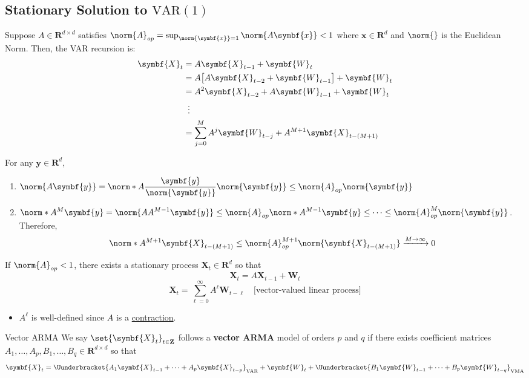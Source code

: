 \subsection*{Stationary Solution to $ \text{VAR}(1) $}
Suppose $ A\in\mathbf{R}^{d\times d} $ satisfies $ \norm{A}_{op}=\sup_{\norm{\symbf{x}}=1}\norm{A \symbf{x}}<1 $
where $ \symbf{x}\in\mathbf{R}^d $ and $ \norm{} $ is the Euclidean Norm.
Then, the VAR recursion is:
\begin{align*}
    \symbf{X}_t
     & =A \symbf{X}_{t-1}+\symbf{W}_t                                   \\
     & =A\bigl[A \symbf{X}_{t-2}+\symbf{W}_{t-1}\bigr]+\symbf{W}_t      \\
     & =A^2 \symbf{X}_{t-2}+ A \symbf{W}_{t-1}+\symbf{W}_t              \\
     & \vdotswithin{=}                                                  \\
     & =\sum_{j=0}^{M} A^j \symbf{W}_{t-j}+ A^{M+1} \symbf{X}_{t-(M+1)}
\end{align*}
\begin{Remark}{}{}
    For any $ \symbf{y}\in\mathbf{R}^d $,
    \begin{enumerate}[(1)]
        \item $ \displaystyle \norm{A \symbf{y}}=\norm*{A \frac{\symbf{y}}{\norm{\symbf{y}}}}\norm{\symbf{y}}\le \norm{A}_{op}\norm{\symbf{y}} $
        \item $ \displaystyle \norm*{A^M \symbf{y}}=\norm {A A^{M-1}\symbf{y}}\le \norm{A}_{op}\norm*{A^{M-1}\symbf{y}}\le \cdots\le \norm{A}_{op}^M\norm{\symbf{y}} $.
              Therefore,
              \[ \norm*{A^{M+1}\symbf{X}_{t-(M+1)}}\le \norm{A}_{op}^{M+1}\norm {\symbf{X}_{t-(M+1)}}\xrightarrow{M\to\infty}0 \]
    \end{enumerate}
\end{Remark}
\begin{Theorem}{}{}
    If $ \norm{A}_{op}< 1 $, there exists a stationary process $ \symbf{X}_t\in\mathbf{R}^d $
    so that
    \[ \symbf{X}_t= A \symbf{X}_{t-1}+\symbf{W}_t \]
    \[ \symbf{X}_t=\sum_{\ell=0}^{\infty} A^\ell \symbf{W}_{t-\ell}\quad\text{[vector-valued linear process]} \]
    \begin{itemize}
        \item $ A^\ell $ is well-defined since $ A $ is a \underline{contraction}.
    \end{itemize}
\end{Theorem}
\begin{Definition}{Vector ARMA}{}
    We say $ \set{\symbf{X}_t}_{t\in\mathbf{Z}} $ follows a \textbf{vector ARMA} model of orders
    $ p $ and $ q $ if there exists coefficient matrices $ A_1,\ldots, A_p,
        B_1,\ldots,B_q\in\mathbf{R}^{d\times d} $ so that
    \[ \symbf{X}_t=\Uunderbracket{A_1 \symbf{X}_{t-1}+\cdots+ A_p \symbf{X}_{t-p}}_{\text{VAR}}
        +\symbf{W}_t+\Uunderbracket{B_1 \symbf{W}_{t-1}+\cdots+B_p \symbf{W}_{t-q}}_{\text{VMA}} \]
\end{Definition}
